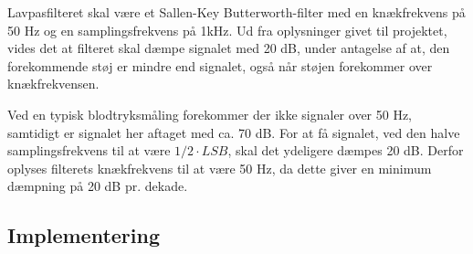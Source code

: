 Lavpasfilteret skal være et Sallen-Key Butterworth-filter med en knækfrekvens på 50 Hz og en samplingsfrekvens på 1kHz. Ud fra oplysninger givet til projektet, vides det at filteret skal dæmpe signalet med 20 dB, under antagelse af at, den forekommende støj er mindre end signalet, også når støjen forekommer over knækfrekvensen.

Ved en typisk blodtryksmåling forekommer der ikke signaler over 50 Hz, samtidigt er signalet her aftaget med ca. 70 dB. For at få signalet, ved den halve samplingsfrekvens til at være $ 1/2 \cdot LSB $, skal det ydeligere dæmpes 20 dB. Derfor oplyses filterets knækfrekvens til at være 50 Hz, da dette giver en minimum dæmpning på 20 dB pr. dekade.

\subsection{Implementering}
